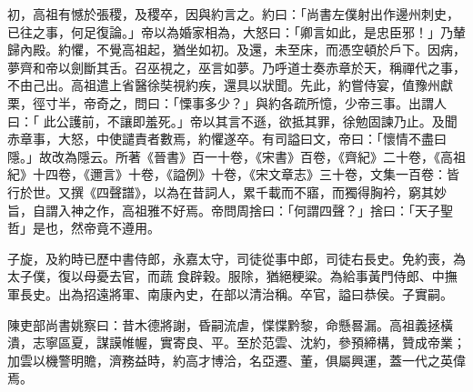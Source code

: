 \begin{pinyinscope}
 初，高祖有憾於張稷，及稷卒，因與約言之。約曰：「尚書左僕射出作邊州刺史，已往之事，何足復論。」帝以為婚家相為，大怒曰：「卿言如此，是忠臣邪！」乃輦歸內殿。約懼，不覺高祖起，猶坐如初。及還，未至床，而憑空頓於戶下。因病，夢齊和帝以劍斷其舌。召巫視之，巫言如夢。乃呼道士奏赤章於天，稱禪代之事，不由己出。高祖遣上省醫徐奘視約疾，還具以狀聞。先此，約嘗侍宴，值豫州獻栗，徑寸半，帝奇之，問曰：「慄事多少？」與約各疏所憶，少帝三事。出謂人曰：「
 此公護前，不讓即羞死。」帝以其言不遜，欲抵其罪，徐勉固諫乃止。及聞赤章事，大怒，中使譴責者數焉，約懼遂卒。有司謚曰文，帝曰：「懷情不盡曰隱。」故改為隱云。所著《晉書》百一十卷，《宋書》百卷，《齊紀》二十卷，《高祖紀》十四卷，《邇言》十卷，《謚例》十卷，《宋文章志》三十卷，文集一百卷：皆行於世。又撰《四聲譜》，以為在昔詞人，累千載而不寤，而獨得胸衿，窮其妙旨，自謂入神之作，高祖雅不好焉。帝問周捨曰：「何謂四聲？」捨曰：「天子聖哲」是也，然帝竟不遵用。



 子旋，及約時已歷中書侍郎，永嘉太守，司徒從事中郎，司徒右長史。免約喪，為太子僕，復以母憂去官，而蔬
 食辟穀。服除，猶絕粳粱。為給事黃門侍郎、中撫軍長史。出為招遠將軍、南康內史，在部以清治稱。卒官，謚曰恭侯。子實嗣。



 陳吏部尚書姚察曰：昔木德將謝，昏嗣流虐，惵惵黔黎，命懸晷漏。高祖義拯橫潰，志寧區夏，謀謨帷幄，實寄良、平。至於范雲、沈約，參預締構，贊成帝業；加雲以機警明贍，濟務益時，約高才博洽，名亞遷、董，俱屬興運，蓋一代之英偉焉。



\end{pinyinscope}